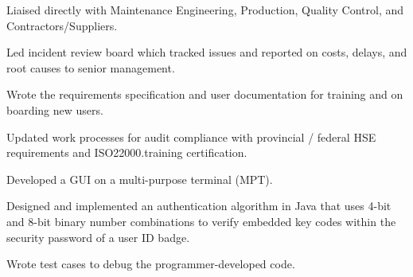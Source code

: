\documentclass[]{deedy-resume-openfont}
\begin{document}
\begin{minipage}[t]{0.61\textwidth}
\begin{tightemize}
\item Liaised directly with Maintenance Engineering, Production, Quality Control, and Contractors/Suppliers.
\item Led incident review board which tracked issues and reported on costs, delays, and root causes to senior management.
\item Wrote the requirements specification and user documentation for training and on boarding new users.
\item Updated work processes for audit compliance with provincial / federal HSE requirements and ISO22000.training certification.
\end{tightemize}
\sectionsep
\fi

{}
\begin{tightemize} 
\item Developed a GUI on a multi-purpose terminal (MPT).
\item Designed and implemented an authentication algorithm in Java that uses 4-bit and 8-bit binary number combinations to verify embedded key codes within the security password of a user ID badge.
\item Wrote test cases to debug the programmer-developed code. 
\end{tightemize}
\sectionsep

\iffalse
\item Developed a GUI for technicians running a multi-purpose terminal (MPT).
\item Designed and implemented an authentication algorithm in Java that uses 4-bit and 8-bit binary number combinations to verify embedded key codes within the security password of a user ID badge.
\item Wrote test cases to debug the programmer-developed code. 
\item Drafted the user documentation that accompanied the GUI.
\fi


\end{minipage}
\end{document}
